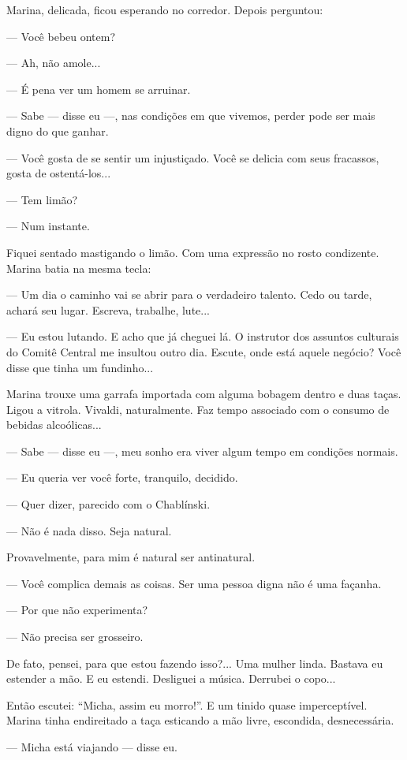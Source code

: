 Marina, delicada, ficou esperando no corredor. Depois perguntou:

--- Você bebeu ontem?

--- Ah, não amole...

--- É pena ver um homem se arruinar.

--- Sabe --- disse eu ---, nas condições em que vivemos, perder pode ser
mais digno do que ganhar.

--- Você gosta de se sentir um injustiçado. Você se delicia com seus
fracassos, gosta de ostentá-los...

--- Tem limão?

--- Num instante.

Fiquei sentado mastigando o limão. Com uma expressão no rosto
condizente. Marina batia na mesma tecla:

--- Um dia o caminho vai se abrir para o verdadeiro talento. Cedo ou
tarde, achará seu lugar. Escreva, trabalhe, lute...

--- Eu estou lutando. E acho que já cheguei lá. O instrutor dos assuntos
culturais do Comitê Central me insultou outro dia. Escute, onde está
aquele negócio? Você disse que tinha um fundinho...

Marina trouxe uma garrafa importada com alguma bobagem dentro e duas
taças. Ligou a vitrola. Vivaldi, naturalmente. Faz tempo associado com o
consumo de bebidas alcoólicas...

--- Sabe --- disse eu ---, meu sonho era viver algum tempo em condições
normais.

--- Eu queria ver você forte, tranquilo, decidido.

--- Quer dizer, parecido com o Chablínski.

--- Não é nada disso. Seja natural.

Provavelmente, para mim é natural ser antinatural.

--- Você complica demais as coisas. Ser uma pessoa digna não é uma
façanha.

--- Por que não experimenta?

--- Não precisa ser grosseiro.

De fato, pensei, para que estou fazendo isso?... Uma mulher linda.
Bastava eu estender a mão. E eu estendi. Desliguei a música. Derrubei o
copo...

Então escutei: ``Micha, assim eu morro!''. E um tinido quase
imperceptível. Marina tinha endireitado a taça esticando a mão livre,
escondida, desnecessária.

--- Micha está viajando --- disse eu.

